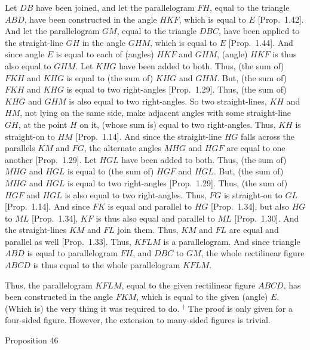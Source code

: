 Let $DB$ have been joined, and let the parallelogram $FH$, equal to
the triangle $ABD$, have been
constructed in the angle $HKF$, which is equal to $E$ [Prop.~1.42].
And let the parallelogram $GM$, equal to the triangle $DBC$, have been
applied to the straight-line $GH$ in the angle $GHM$,
which is equal to $E$ [Prop.~1.44]. And since angle $E$ is equal to each of
(angles) $HKF$ and $GHM$,  (angle) $HKF$ is thus also equal to $GHM$. 
Let $KHG$ have been added to both. Thus, (the sum of) $FKH$ and $KHG$ is
equal to (the sum of) $KHG$ and $GHM$. But, (the sum of) $FKH$ and $KHG$ is equal to
two right-angles [Prop.~1.29]. Thus, (the sum of) $KHG$ and $GHM$ is also equal to
two right-angles. So two straight-lines, $KH$ and $HM$, not lying on the same side, make  adjacent angles with some straight-line $GH$, 
at the point $H$ on it, (whose sum is) equal to two right-angles.
Thus, $KH$ is straight-on to $HM$ [Prop.~1.14].
And since the straight-line $HG$ falls across the parallels $KM$ and $FG$, the alternate angles
$MHG$ and $HGF$ are equal to one another [Prop.~1.29]. Let $HGL$ have
been added to both. Thus, (the sum of) $MHG$ and $HGL$ is equal to 
(the sum of) $HGF$ and $HGL$.
But, (the sum of) $MHG$ and $HGL$ is equal to two right-angles [Prop.~1.29].
Thus, (the sum of) $HGF$ and $HGL$ is also equal to two right-angles.
Thus, $FG$ is straight-on to $GL$ [Prop.~1.14]. And since $FK$ is
equal and parallel to $HG$ [Prop.~1.34], but also $HG$ to $ML$ [Prop.~1.34],
$KF$ is thus also equal and parallel to $ML$ [Prop.~1.30]. And the straight-lines $KM$ and
$FL$ join them. Thus, $KM$ and $FL$ are equal and parallel as well [Prop.~1.33].
Thus, $KFLM$ is a parallelogram. And since triangle $ABD$ is equal to parallelogram $FH$, and $DBC$ to $GM$, the whole rectilinear figure
$ABCD$ is thus equal to the whole parallelogram $KFLM$.

\epsfysize=2.7in
\centerline{}

Thus, the parallelogram $KFLM$, equal to the given
rectilinear figure $ABCD$, has been constructed in the angle
$FKM$, which is equal to the given (angle) $E$. (Which is) the very thing it was
required to do.
{\footnotesize \noindent$^\dag$ The proof is only given for a four-sided figure. However, the extension to many-sided figures is
trivial.}


\begin{center}
{\large Proposition 46}
\end{center}


